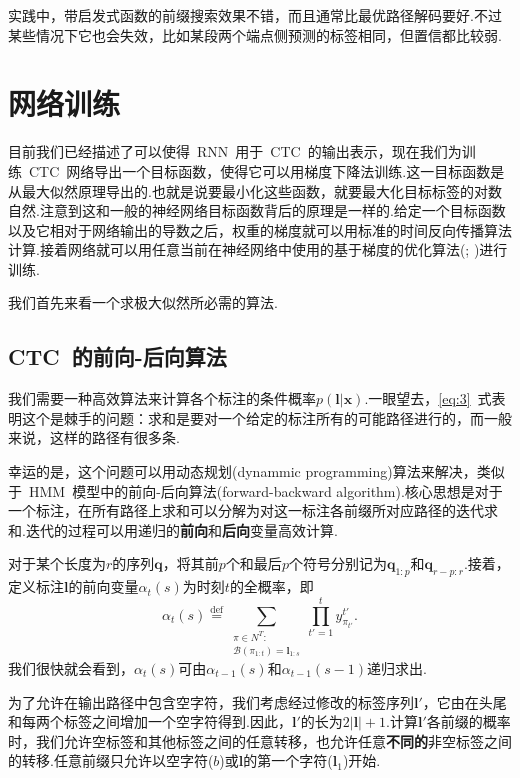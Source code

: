 \documentclass{ctexart}
\def\cB{\mathcal{B}}
\def\vl{\mathbf{l}}
\def\vx{\mathbf{x}}
\def\vq{\mathbf{q}}
\def\defeq{\overset{\mathrm{def}}{=}}
\begin{document}
实践中，带启发式函数的前缀搜索效果不错，而且通常比最优路径解码要好.不过某些情况下它也会失效，比如某段两个端点侧预测的标签相同，但置信都比较弱.
\section{网络训练}
\label{sec:training}
目前我们已经描述了可以使得~RNN~用于~CTC~的输出表示，现在我们为训练~CTC~网络导出一个目标函数，使得它可以用梯度下降法训练.这一目标函数是从最大似然原理导出的.也就是说要最小化这些函数，就要最大化目标标签的对数自然.注意到这和一般的神经网络目标函数\citep{bishop1995neural}背后的原理是一样的.给定一个目标函数以及它相对于网络输出的导数之后，权重的梯度就可以用标准的时间反向传播算法计算.接着网络就可以用任意当前在神经网络中使用的基于梯度的优化算法(\citealp{lecun1998efficient}; \citealp{schraudolph2002fast})进行训练.

我们首先来看一个求极大似然所必需的算法.
\subsection{CTC~的前向-后向算法}
\label{sec:forward-backward}
我们需要一种高效算法来计算各个标注的条件概率$p(\vl|\vx)$.一眼望去，\eqref{eq:3}~式表明这个是棘手的问题：求和是要对一个给定的标注所有的可能路径进行的，而一般来说，这样的路径有很多条.

幸运的是，这个问题可以用动态规划(dynammic programming)算法来解决，类似于~HMM~模型中的前向-后向算法(forward-backward algorithm).核心思想是对于一个标注，在所有路径上求和可以分解为对这一标注各前缀所对应路径的迭代求和.迭代的过程可以用递归的\textbf{前向}和\textbf{后向}变量高效计算.

对于某个长度为$r$的序列$\vq$，将其前$p$个和最后$p$个符号分别记为$\vq_{1:p}$和$\vq_{r-p:r}$.接着，定义标注$\vl$的前向变量$\alpha_t(s)$为时刻$t$的全概率，即
\begin{equation}
	\label{eq:5}
	\alpha_t(s)
	\defeq
	\sum_{
		\substack{
			\pi\in N^T:\\
			\cB(\pi_{1:t}) = \vl_{1:s}
		}
	}
	\prod_{t'=1}^t y_{\pi_{t'}}^{t'}.
\end{equation}
我们很快就会看到，$\alpha_t(s)$可由$\alpha_{t-1}(s)$和$\alpha_{t-1}(s-1)$递归求出.

为了允许在输出路径中包含空字符，我们考虑经过修改的标签序列$\vl'$，它由在头尾和每两个标签之间增加一个空字符得到.因此，$\vl'$的长为$2|\vl|+1$.计算$\vl'$各前缀的概率时，我们允许空标签和其他标签之间的任意转移，也允许任意\textbf{不同的}非空标签之间的转移.任意前缀只允许以空字符($b$)或$\vl$的第一个字符($\vl_1$)开始.
\end{document}
